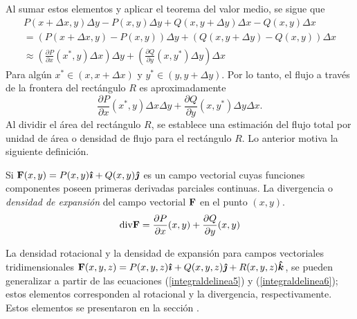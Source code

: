 Al sumar estos elementos y aplicar el teorema del valor medio, se sigue que
\begin{multline}
P( x+\Delta x,y) \Delta y-P(x,y) \Delta y+Q\left(x,y+\Delta y\right) \Delta x-Q(x,y) \Delta x \\
= \left( P( x+\Delta x,y) -P(x,y) \right)\Delta y+\left( Q\left( x,y+\Delta y\right) -Q(x,y) \right)\Delta x \\
\approx \left( \frac{\partial P}{\partial x}(x^{\ast },y)\Delta x\right) \Delta y+\left( \frac{\partial Q}{\partial y}\left(x,y^{\ast }\right) \Delta y\right) \Delta x
\end{multline}
Para algún $x^* \in (x,x+\Delta x)$ y $y^* \in (y,y+\Delta y)$.
Por lo tanto, el flujo a través de la frontera del rectángulo $R$ es aproximadamente
\[\frac{\partial P}{\partial x}(x^*,y) \Delta x\Delta y+\frac{\partial Q}{\partial y}(x,y^*) \Delta y\Delta x.\]
Al dividir  el área del rectángulo $R$, se establece una estimación del flujo total por unidad de área o densidad de flujo para el rectángulo $R$. Lo anterior motiva la siguiente definición.

\begin{defi}
Si ${\bf F} (x,y)=P(x,y) \boldsymbol{\hat{\imath}}+Q(x,y) \boldsymbol{\hat{\jmath}}$ es un campo vectorial cuyas funciones componentes poseen primeras derivadas parciales continuas.
La divergencia o \textit{densidad de expansión} del campo vectorial ${\bf F}$ en el punto $(x,y)$.
\begin{equation} \label{integraldelinea6}
{\rm div}{\bf F} =\frac{\partial P}{\partial x}(x,y) +\frac{\partial Q}{\partial y}(x,y)
\end{equation}
 
\end{defi}

La densidad rotacional y la densidad de expansión para campos vectoriales tridimensionales ${\bf F}(x,y,z) =P(x,y,z)\boldsymbol{\hat{\imath}} +Q(x,y,z)\boldsymbol{\hat{\jmath}}+R(x,y,z)\boldsymbol{\hat{k}}$,
se pueden generalizar a partir de las ecuaciones (\ref{integraldelinea5})  y (\ref{integraldelinea6});
estos elementos corresponden al rotacional y la divergencia, respectivamente.
Estos elementos se presentaron en la sección .
 

